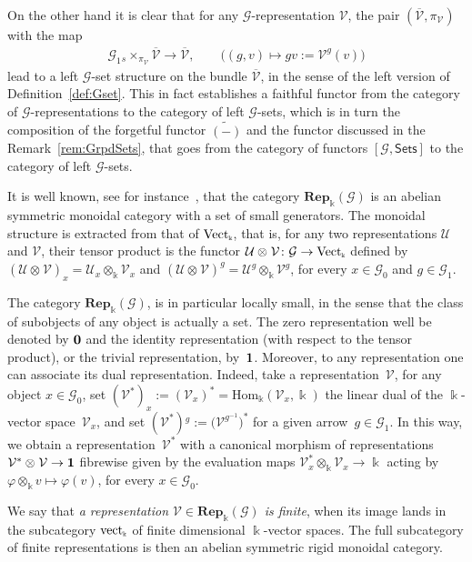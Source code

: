 \documentclass[pdftex]{sigma}
\numberwithin{equation}{section}
\newcommand{\tensor}[1]{\otimes_{\scriptscriptstyle{#1}}}
\renewcommand{\hom}[3]{\mathrm{Hom}_{\Sscript{#1}}\left(#2, #3\right)}
\newcommand{\td}[1]{\widetilde{#1}}
\newcommand{\bara}[1]{\overline{#1}}
\newcommand{\Rep}[1]{\mathbf{Rep}_{\Sscript{\Bbbk}}(#1)}
\newcommand{\Vect}{{\rm Vect}_{\Sscript{\Bbbk}}}
\newcommand{\vect}{{\rm vect}_{\Sscript{\Bbbk}}}
\newcommand{\Go}{\cG_{\Sscript{0}}}
\newcommand{\Ga}{\cG_{\Sscript{1}}}
\newcommand{\Vx}{\cV_{\Sscript{x}}}
\newcommand{\Vg}{\cV^{\Sscript{g}}}
\newcommand{\cG}{{\mathcal G}}
\newcommand{\cU}{{\mathcal U}}
\newcommand{\cV}{{\mathcal V}}
\newcommand{\Sets}{\mathsf{Sets}}
\newcommand{\Sscript}[1]{\scriptscriptstyle{#1}}
\newcommand{\due}[3]{{}_{{#2 }} {#1}_{{ #3}} }
\begin{document}
\begin{Remark}
On the other hand it is clear that for any $\cG$-representation $\cV$, the pair $(\bara{\cV}, \pi_{\Sscript{\cV}})$ with the map
\begin{gather}\label{Eq:actionV}
\Ga \due \times {\Sscript{s}} { \Sscript{\pi_{\cV}}} \bara{\cV} \longrightarrow \bara{\cV},\qquad \big((g,v) \longmapsto gv:=\Vg(v) \big)
\end{gather}
lead to a left $\cG$-set structure on the bundle $\bara{\cV}$, in the sense of the left version of Definition~\ref{def:Gset}. This in fact establishes a faithful functor from the category of $\cG$-representations to the category of left $\cG$-sets, which is in turn the composition of the forgetful functor $\td{(-)}$ and the functor discussed in the Remark~\ref{rem:GrpdSets}, that goes from the category of functors $[\cG, \Sets]$ to the category of left $\cG$-sets.
\end{Remark}

It is well known, see for instance~\cite{Mitchell:1965}, that the category $\Rep{\cG}$ is an abelian symmetric monoidal category with a set of small generators. The monoidal structure is extracted from that of $\Vect$, that is, for any two representations $\cU$ and $\cV$, their tensor product is the functor $\cU \tensor{}\cV\colon \cG \to \Vect$ defined by $(\cU\tensor{}\cV)_{\Sscript{x}}= \cU_{\Sscript{x}} \tensor{\Bbbk}\cV_{\Sscript{x}}$ and
$(\cU\tensor{}\cV)^{\Sscript{g}}= \cU^{\Sscript{g}}\tensor{\Bbbk} \cV^{\Sscript{g}}$, for every $x \in \Go$ and $g \in \Ga$.

The category $\Rep{\cG}$, is in particular locally small, in the sense that the class of subobjects of any object is actually a set. The zero representation well be denoted by $\bf 0$ and the identity representation (with respect to the tensor product), or the trivial representation, by~$\bf 1$. Moreover, to any representation one can associate its dual representation. Indeed, take a representation~$\cV$, for any object $x \in \Go$, set $(\cV^*)_{\Sscript{x}}:= (\cV_{\Sscript{x}})^*=\hom{\Bbbk}{\cV_{\Sscript{x}}}{\Bbbk}$ the linear dual of the $\Bbbk$-vector space~$\cV_{\Sscript{x}}$, and set $(\cV^*){}^g:= \big(\cV^{\Sscript{g^{-1}}}\big)^*$ for a given arrow~$g \in \Ga$. In this way, we obtain a representation~$\cV^*$ with a canonical morphism of representations $\cV^* \tensor{} \cV \to {\bf 1}$ fibrewise given by the evaluation maps $\cV^*_{\Sscript{x}} \tensor{\Bbbk} \Vx \to \Bbbk$ acting by $\varphi \tensor{\Bbbk}v \mapsto \varphi(v)$, for every $x \in \Go$.

We say that \emph{a representation $\cV \in \Rep{\cG}$ is finite}, when its image lands in the subcategory $\vect$ of finite dimensional $\Bbbk$-vector spaces. The full subcategory of finite representations is then an abelian symmetric rigid monoidal category.
\end{document}
